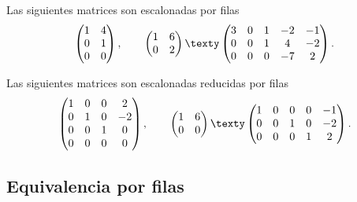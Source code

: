\documentclass[compacto,10pt]{pubciencias-notas}
\begin{document}
\begin{ejem}\hspace{0pt} Las siguientes matrices son escalonadas por filas
\[
    \begin{pmatrix}
        1&4\\
        0&1\\
        0&0
    \end{pmatrix},\qquad
    \begin{pmatrix}
        1&6\\
        0&2
    \end{pmatrix} \texty
    \begin{pmatrix}
        3&0&1&-2&-1\\
        0&0&1&4&-2\\
        0&0&0&-7&2
    \end{pmatrix}.
\]

\end{ejem}
\begin{ejem}\hspace{0pt} Las siguientes matrices son escalonadas reducidas por filas
\[
    \begin{pmatrix}
        1&0&0&2\\
        0&1&0&-2\\
        0&0&1&0\\
        0&0&0&0
    \end{pmatrix},\qquad
    \begin{pmatrix}
        1&6\\
        0&0
    \end{pmatrix} \texty
    \begin{pmatrix}
        1&0&0&0&-1\\
        0&0&1&0&-2\\
        0&0&0&1&2
    \end{pmatrix}.
\]
\end{ejem}

\subsection{Equivalencia por filas}
\end{document}
